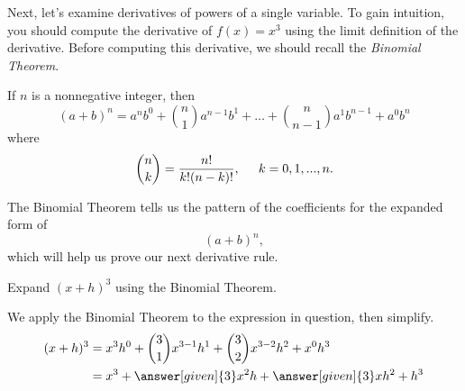 \documentclass{ximera}
\begin{document}
Next, let's examine derivatives of powers of a single variable. 
To gain intuition, you should compute the
derivative of $f(x) = x^3$ using the limit definition of the
derivative. Before computing this derivative, we should recall 
the \textit{Binomial Theorem}.

\begin{theorem}
If $n$ is a nonnegative integer, then
\[
(a+b)^n = a^nb^0 + \binom{n}{1} a^{n-1}b^1 + \dots + \binom{n}{n-1} a^{1}b^{n-1} +  a^{0}b^n   
\]
where
\[
\binom{n}{k} = \frac{n!}{k!(n-k)!}, \hspace{0.2in}k=0,1,...,n.
\]
\end{theorem}
The Binomial Theorem tells us the pattern of the coefficients for the
expanded form of
\[
(a+b)^n,
\]
which will help us prove our next derivative rule.

\begin{example}
Expand $(x+h)^3$ using the Binomial Theorem.
\begin{explanation}
We apply the Binomial Theorem to the expression in question, then simplify.
\begin{align*}
(x+h)^3 &= x^3h^0 + \binom{3}{1} x^{3-1}h^1 + \binom{3}{2} x^{3-2}h^2 + x^{0}h^3\\
	& = x^3 + \answer[given]{3} x^2 h + \answer[given]{3} xh^2 + h^3
\end{align*}
\end{explanation}
\end{example}
\end{document}
